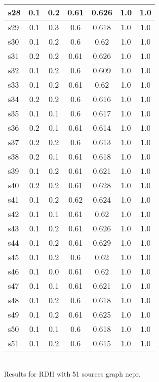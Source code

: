 \documentclass{article}
\begin{document}
\begin{tabular}{|l|c|c|c|c|c|c|}
\hline
s28 &0.1 & 0.2 & 0.61 & 0.626 & 1.0 & 1.0\\
\hline
s29 &0.1 & 0.3 & 0.6 & 0.618 & 1.0 & 1.0\\
\hline
s30 &0.1 & 0.2 & 0.6 & 0.62 & 1.0 & 1.0\\
\hline
s31 &0.2 & 0.2 & 0.61 & 0.626 & 1.0 & 1.0\\
\hline
s32 &0.1 & 0.2 & 0.6 & 0.609 & 1.0 & 1.0\\
\hline
s33 &0.1 & 0.2 & 0.61 & 0.62 & 1.0 & 1.0\\
\hline
s34 &0.2 & 0.2 & 0.6 & 0.616 & 1.0 & 1.0\\
\hline
s35 &0.1 & 0.1 & 0.6 & 0.617 & 1.0 & 1.0\\
\hline
s36 &0.2 & 0.1 & 0.61 & 0.614 & 1.0 & 1.0\\
\hline
s37 &0.2 & 0.2 & 0.6 & 0.613 & 1.0 & 1.0\\
\hline
s38 &0.2 & 0.1 & 0.61 & 0.618 & 1.0 & 1.0\\
\hline
s39 &0.1 & 0.2 & 0.61 & 0.621 & 1.0 & 1.0\\
\hline
s40 &0.2 & 0.2 & 0.61 & 0.628 & 1.0 & 1.0\\
\hline
s41 &0.1 & 0.2 & 0.62 & 0.624 & 1.0 & 1.0\\
\hline
s42 &0.1 & 0.1 & 0.61 & 0.62 & 1.0 & 1.0\\
\hline
s43 &0.1 & 0.2 & 0.61 & 0.626 & 1.0 & 1.0\\
\hline
s44 &0.1 & 0.2 & 0.61 & 0.629 & 1.0 & 1.0\\
\hline
s45 &0.1 & 0.2 & 0.6 & 0.62 & 1.0 & 1.0\\
\hline
s46 &0.1 & 0.0 & 0.61 & 0.62 & 1.0 & 1.0\\
\hline
s47 &0.1 & 0.1 & 0.61 & 0.621 & 1.0 & 1.0\\
\hline
s48 &0.1 & 0.2 & 0.6 & 0.618 & 1.0 & 1.0\\
\hline
s49 &0.1 & 0.2 & 0.61 & 0.625 & 1.0 & 1.0\\
\hline
s50 &0.1 & 0.1 & 0.6 & 0.618 & 1.0 & 1.0\\
\hline
s51 &0.1 & 0.2 & 0.6 & 0.615 & 1.0 & 1.0\\
\hline
\end{tabular}\\

\noindent Results for RDH with 51 sources graph ncpr.
\end{document}
